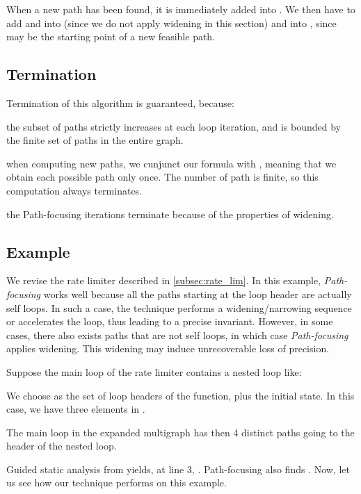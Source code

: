 When a new path has been found, it is immediately added into . 
We then have to add  and  into  (since we do not apply widening in
this section) and  into , since  may be the starting point of a
new feasible path.

\subsection{Termination}
Termination of this algorithm is guaranteed, because:
\begin{inparaenum}
\item 
the subset of paths  strictly increases at each loop iteration,
and is bounded by the finite set of
paths in the entire graph. 
\item
	when computing new paths, we cunjunct our formula with , meaning
	that we obtain each possible path only once. The number of path is finite,
	so this computation always terminates.
\item
	the Path-focusing iterations terminate because of the properties of
	widening.
\end{inparaenum}

\subsection{Example}

We revise the rate limiter described in \ref{subsec:rate_lim}. In this example,
\emph{Path-focusing} works well because all the paths starting at the
loop header are actually self loops. In such a case, the technique performs a
widening/narrowing sequence or accelerates the loop, thus leading to a precise
invariant. However, in some cases, there also exists paths that are not
self loops, in which case \emph{Path-focusing} applies widening. 
This widening may induce unrecoverable loss of precision.

Suppose the main loop of the rate limiter contains a nested loop like:


We choose  as the set of loop headers of the function, plus the initial
state. In this case, we have three elements in .

The main loop in the expanded multigraph has then 4 distinct paths going to the header of the nested loop.

Guided static analysis from \cite{DBLP:conf/sas/GopanR07} yields, at line 3,
.
Path-focusing \cite{Monniaux_Gonnord_SAS11} also
finds .
Now, let us see how our technique performs on this example.

